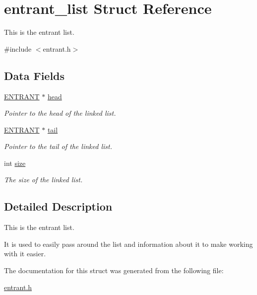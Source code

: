\hypertarget{structentrant__list}{\section{entrant\-\_\-list Struct Reference}
\label{structentrant__list}
}


This is the entrant list.  




{\ttfamily \#include $<$entrant.\-h$>$}

\subsection*{Data Fields}
\begin{DoxyCompactItemize}
\item 
\hypertarget{structentrant__list_a1e9f9011f4b40749efe746258209a3f5}{\hyperlink{entrant_8h_a0e99575e41c762d6089bed6332ce69b3}{E\-N\-T\-R\-A\-N\-T} $\ast$ \hyperlink{structentrant__list_a1e9f9011f4b40749efe746258209a3f5}{head}}\label{structentrant__list_a1e9f9011f4b40749efe746258209a3f5}

\begin{DoxyCompactList}\small\item\em Pointer to the head of the linked list. \end{DoxyCompactList}\item 
\hypertarget{structentrant__list_acce08b5513a2dd4d928d1cbb195482f4}{\hyperlink{entrant_8h_a0e99575e41c762d6089bed6332ce69b3}{E\-N\-T\-R\-A\-N\-T} $\ast$ \hyperlink{structentrant__list_acce08b5513a2dd4d928d1cbb195482f4}{tail}}\label{structentrant__list_acce08b5513a2dd4d928d1cbb195482f4}

\begin{DoxyCompactList}\small\item\em Pointer to the tail of the linked list. \end{DoxyCompactList}\item 
\hypertarget{structentrant__list_a8e6f4550d213ee8eac73a117c511d88f}{int \hyperlink{structentrant__list_a8e6f4550d213ee8eac73a117c511d88f}{size}}\label{structentrant__list_a8e6f4550d213ee8eac73a117c511d88f}

\begin{DoxyCompactList}\small\item\em The size of the linked list. \end{DoxyCompactList}\end{DoxyCompactItemize}


\subsection{Detailed Description}
This is the entrant list. 

It is used to easily pass around the list and information about it to make working with it easier. 

The documentation for this struct was generated from the following file\-:\begin{DoxyCompactItemize}
\item 
\hyperlink{entrant_8h}{entrant.\-h}\end{DoxyCompactItemize}
